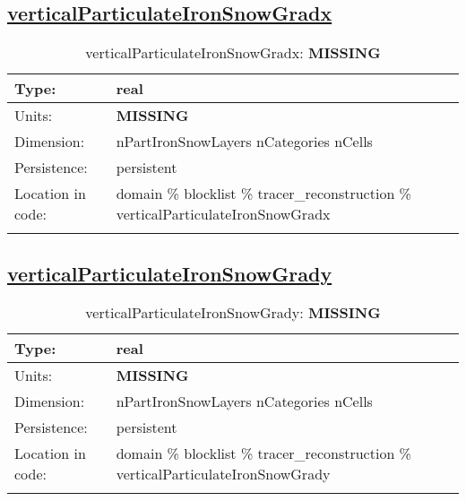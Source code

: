 \subsection[verticalParticulateIronSnowGradx]{\hyperref[sec:var_tab_tracer_reconstruction]{verticalParticulateIronSnowGradx}}
\label{subsec:var_sec_tracer_reconstruction_verticalParticulateIronSnowGradx}
\begin{center}
\begin{longtable}{| p{2.0in} | p{4.0in} |}
        \hline 
        Type: & real \\
        \hline 
        Units: & {\bf \color{red} MISSING} \\
        \hline 
        Dimension: & nPartIronSnowLayers nCategories nCells \\
        \hline 
        Persistence: & persistent \\
        \hline 
         Location in code: & domain \% blocklist \% tracer\_reconstruction \% verticalParticulateIronSnowGradx \\
         \hline 
    \caption{verticalParticulateIronSnowGradx: {\bf \color{red} MISSING}}
\end{longtable}
\end{center}
\subsection[verticalParticulateIronSnowGrady]{\hyperref[sec:var_tab_tracer_reconstruction]{verticalParticulateIronSnowGrady}}
\label{subsec:var_sec_tracer_reconstruction_verticalParticulateIronSnowGrady}
\begin{center}
\begin{longtable}{| p{2.0in} | p{4.0in} |}
        \hline 
        Type: & real \\
        \hline 
        Units: & {\bf \color{red} MISSING} \\
        \hline 
        Dimension: & nPartIronSnowLayers nCategories nCells \\
        \hline 
        Persistence: & persistent \\
        \hline 
         Location in code: & domain \% blocklist \% tracer\_reconstruction \% verticalParticulateIronSnowGrady \\
         \hline 
    \caption{verticalParticulateIronSnowGrady: {\bf \color{red} MISSING}}
\end{longtable}
\end{center}
